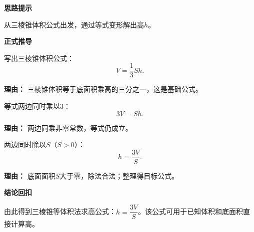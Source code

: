 \begin{proofbox}

	\textbf{\textcolor{CProof}{思路提示}}

	从三棱锥体积公式出发，通过等式变形解出高$h$。

	\medskip
	\textbf{\textcolor{CProof}{正式推导}}
	\begin{description}[style=nextline, leftmargin=2.8em, labelsep=0.5em, itemsep=0.55em]
		\item[\textbf{步骤一（体积公式）：}] 写出三棱锥体积公式：
			\[
				V = \frac13 S h.
			\]
			\par\textbf{理由：}
			三棱锥体积等于底面积乘高的三分之一，这是基础公式。

		\item[\textbf{步骤二（去分母）：}] 等式两边同时乘以$3$：
			\[
				3V = S h.
			\]
			\par\textbf{理由：}
			两边同乘非零常数，等式仍成立。

		\item[\textbf{步骤三（除法求高）：}] 两边同时除以$S$（$S>0$）：
			\[
				h = \frac{3V}{S}.
			\]
			\par\textbf{理由：}
			底面面积$S$大于零，除法合法；整理得目标公式。
	\end{description}

	\medskip
	\textbf{\textcolor{CProof}{结论回扣}}

	由此得到三棱锥等体积法求高公式：$h = \dfrac{3V}{S}$。该公式可用于已知体积和底面积直接计算高。

\end{proofbox}
